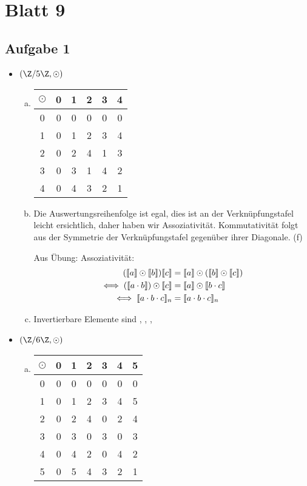 \section*{Blatt 9}

\subsection*{Aufgabe 1}

\begin{itemize}
  \item $ (\Z / 5 \Z, \odot) $
  \begin{enumerate}[a)]
  \item
    \begin{tabular}{c|ccccc}
    $\odot$ & 0 & 1 & 2 & 3 & 4 \\
    \hline
    0 & 0 & 0 & 0 & 0 & 0 \\
    1 & 0 & 1 & 2 & 3 & 4 \\
    2 & 0 & 2 & 4 & 1 & 3 \\
    3 & 0 & 3 & 1 & 4 & 2 \\
    4 & 0 & 4 & 3 & 2 & 1 \\
    \end{tabular}
    \item Die Auswertungsreihenfolge ist egal, dies ist an der Verknüpfungstafel leicht ersichtlich, daher haben wir Assoziativität. Kommutativität folgt aus der Symmetrie der Verknüpfungstafel gegenüber ihrer Diagonale. (f)

    Aus Übung:
    Assoziativität:
    \begin{align*}
      (\dbr{a} \odot \dbr{b}) \dbr{c} &= \dbr{a} \odot (\dbr{b} \odot \dbr{c}) \\
      \iff (\dbr{a \cdot b}) \odot \dbr{c} &= \dbr{a} \odot \dbr{b \cdot c} \\
      \iff \dbr{a \cdot b \cdot c}_n &= \dbr{a \cdot b \cdot c}_n \\
    \end{align*}
    \item Invertierbare Elemente sind , , , 

    \end{enumerate}



  \item $ (\Z / 6 \Z, \odot) $
  \begin{enumerate}[a)]
  \item
  \begin{tabular}{c|cccccc}
    $\odot$ & 0 & 1 & 2 & 3 & 4 & 5\\
    \hline
    0 & 0 & 0 & 0 & 0 & 0 & 0 \\
    1 & 0 & 1 & 2 & 3 & 4 & 5 \\
    2 & 0 & 2 & 4 & 0 & 2 & 4 \\
    3 & 0 & 3 & 0 & 3 & 0 & 3 \\
    4 & 0 & 4 & 2 & 0 & 4 & 2 \\
    5 & 0 & 5 & 4 & 3 & 2 & 1 \\


\end{tabular}
\end{enumerate}
\end{itemize}
